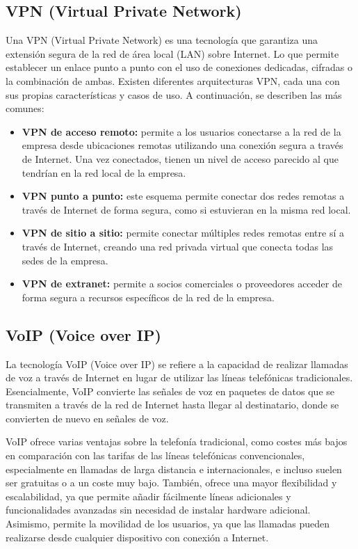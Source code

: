 \subsection{VPN (Virtual Private Network)}
\label{subsec:vpn}
Una VPN (Virtual Private Network) \cite{wikipedia_vpn} es una tecnología que garantiza una extensión segura de la red de área local (LAN) sobre Internet. Lo que permite establecer un enlace punto a punto con el uso de conexiones dedicadas, cifradas o la combinación de ambas. Existen diferentes arquitecturas VPN, cada una con sus propias características y casos de uso. A continuación, se describen las más comunes:

\begin{itemize}
  \item \textbf{VPN de acceso remoto:} permite a los usuarios conectarse a la red de la empresa desde ubicaciones remotas utilizando una conexión segura a través de Internet. Una vez conectados, tienen un nivel de acceso parecido al que tendrían en la red local de la empresa.
  \item \textbf{VPN punto a punto:} este esquema permite conectar dos redes remotas a través de Internet de forma segura, como si estuvieran en la misma red local.
  \item \textbf{VPN de sitio a sitio:} permite conectar múltiples redes remotas entre sí a través de Internet, creando una red privada virtual que conecta todas las sedes de la empresa.
  \item \textbf{VPN de extranet:} permite a socios comerciales o proveedores acceder de forma segura a recursos específicos de la red de la empresa.
\end{itemize}

\subsection{VoIP (Voice over IP)}
La tecnología VoIP \cite{voipstudio_que_es_voip} (Voice over IP) se refiere a la capacidad de realizar llamadas de voz a través de Internet en lugar de utilizar las líneas telefónicas tradicionales. Esencialmente, VoIP convierte las señales de voz en paquetes de datos que se transmiten a través de la red de Internet hasta llegar al destinatario, donde se convierten de nuevo en señales de voz.

\vspace{0.5cm}
VoIP ofrece varias ventajas sobre la telefonía tradicional, como costes más bajos en comparación con las tarifas de las líneas telefónicas convencionales, especialmente en llamadas de larga distancia e internacionales, e incluso suelen ser gratuitas o a un coste muy bajo. También, ofrece una mayor flexibilidad y escalabilidad, ya que permite añadir fácilmente líneas adicionales y funcionalidades avanzadas sin necesidad de instalar hardware adicional. Asimismo, permite la movilidad de los usuarios, ya que las llamadas pueden realizarse desde cualquier dispositivo con conexión a Internet.



